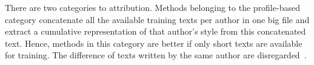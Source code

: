 There are two categories to attribution.
Methods belonging to the profile-based category concatenate all the available training texts per author in one big file 
and extract a cumulative representation of that author's style from this concatenated text. %
Hence, methods in this category are better if only short texts are available for training.
The difference of texts written by the same author are disregarded~\citep{stamatatos_survey_2009,elmanarelbouanani_authorship_2014,neal_surveying_2018}.
